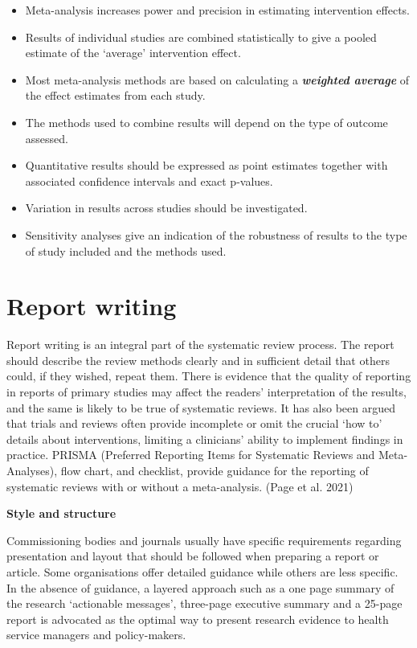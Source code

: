 \documentclass[
  10pt,
  a4paper,
  DIV=11,
  numbers=noendperiod]{scrreprt}
\begin{document}
\begin{itemize}
  \begin{itemize}
  \item
    Meta-analysis increases power and precision in estimating
    intervention effects.
  \item
    Results of individual studies are combined statistically to give a
    pooled estimate of the `average' intervention effect.
  \item
    Most meta-analysis methods are based on calculating a
    \textbf{\emph{weighted average}} of the effect estimates from each
    study.
  \item
    The methods used to combine results will depend on the type of
    outcome assessed.
  \item
    Quantitative results should be expressed as point estimates together
    with associated confidence intervals and exact p-values.
  \item
    Variation in results across studies should be investigated.
  \item
    Sensitivity analyses give an indication of the robustness of results
    to the type of study included and the methods used.
  \end{itemize}
\end{itemize}

\section{Report writing}\label{report-writing}

Report writing is an integral part of the systematic review process. The
report should describe the review methods clearly and in sufficient
detail that others could, if they wished, repeat them. There is evidence
that the quality of reporting in reports of primary studies may affect
the readers' interpretation of the results, and the same is likely to be
true of systematic reviews. It has also been argued that trials and
reviews often provide incomplete or omit the crucial `how to' details
about interventions, limiting a clinicians' ability to implement
findings in practice. PRISMA (Preferred Reporting Items for Systematic
Reviews and Meta- Analyses), flow chart, and checklist, provide guidance
for the reporting of systematic reviews with or without a meta-analysis.
(Page et al. 2021)

\textbf{Style and structure}

Commissioning bodies and journals usually have specific requirements
regarding presentation and layout that should be followed when preparing
a report or article. Some organisations offer detailed guidance while
others are less specific. In the absence of guidance, a layered approach
such as a one page summary of the research `actionable messages',
three-page executive summary and a 25-page report is advocated as the
optimal way to present research evidence to health service managers and
policy-makers.
\end{document}
